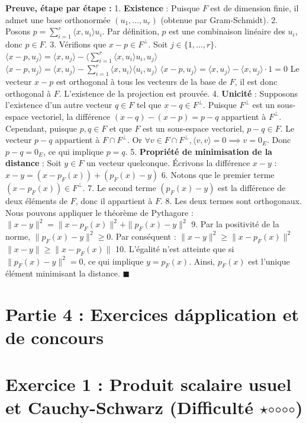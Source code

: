 \documentclass{report}
\begin{document}
\textbf{Preuve, étape par étape :}
1. \textbf{Existence} : Puisque $F$ est de dimension finie, il admet une base orthonormée $(u_1, \ldots, u_r)$ (obtenue par Gram-Schmidt).
2. Posons $p = \sum_{i=1}^r \langle x, u_i \rangle u_i$. Par définition, $p$ est une combinaison linéaire des $u_i$, donc $p \in F$.
3. Vérifions que $x - p \in F^\perp$. Soit $j \in \{1, \ldots, r\}$.
   $ \langle x - p, u_j \rangle = \langle x, u_j \rangle - \langle \sum_{i=1}^r \langle x, u_i \rangle u_i, u_j \rangle $
   $ \langle x - p, u_j \rangle = \langle x, u_j \rangle - \sum_{i=1}^r \langle x, u_i \rangle \langle u_i, u_j \rangle $
   $ \langle x - p, u_j \rangle = \langle x, u_j \rangle - \langle x, u_j \rangle \cdot 1 = 0 $
   Le vecteur $x-p$ est orthogonal à tous les vecteurs de la base de $F$, il est donc orthogonal à $F$. L'existence de la projection est prouvée.
4. \textbf{Unicité} : Supposons l'existence d'un autre vecteur $q \in F$ tel que $x - q \in F^\perp$.
   Puisque $F^\perp$ est un sous-espace vectoriel, la différence $(x-q) - (x-p) = p - q$ appartient à $F^\perp$.
   Cependant, puisque $p, q \in F$ et que $F$ est un sous-espace vectoriel, $p - q \in F$.
   Le vecteur $p-q$ appartient à $F \cap F^\perp$. Or $\forall v \in F \cap F^\perp, \langle v, v \rangle = 0 \implies v = 0_E$.
   Donc $p-q = 0_E$, ce qui implique $p=q$.
5. \textbf{Propriété de minimisation de la distance} : Soit $y \in F$ un vecteur quelconque. Écrivons la différence $x-y$ :
   $ x - y = (x - p_F(x)) + (p_F(x) - y) $
6. Notons que le premier terme $(x - p_F(x)) \in F^\perp$.
7. Le second terme $(p_F(x) - y)$ est la différence de deux éléments de $F$, donc il appartient à $F$.
8. Les deux termes sont orthogonaux. Nous pouvons appliquer le théorème de Pythagore :
   $ \|x - y\|^2 = \|x - p_F(x)\|^2 + \|p_F(x) - y\|^2 $
9. Par la positivité de la norme, $\|p_F(x) - y\|^2 \ge 0$. Par conséquent :
   $ \|x - y\|^2 \ge \|x - p_F(x)\|^2 $
   $ \|x - y\| \ge \|x - p_F(x)\| $
10. L'égalité n'est atteinte que si $\|p_F(x) - y\|^2 = 0$, ce qui implique $y = p_F(x)$. Ainsi, $p_F(x)$ est l'unique élément minimisant la distance.
    $\blacksquare$

\newpage
\chapter*{Partie 4 : Exercices d\'application et de concours}


\chapter*{Exercice 1 : Produit scalaire usuel et Cauchy-Schwarz (Difficulté $\star$$\circ$$\circ$$\circ$$\circ$)}
\end{document}
